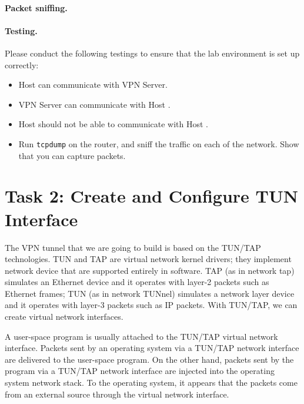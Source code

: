 \paragraph{Packet sniffing.} 




\paragraph{Testing.} Please conduct the following testings to ensure that the 
lab environment is set up correctly:

\begin{itemize}[noitemsep]
\item Host \hostu can communicate with VPN Server.

\item VPN Server can communicate with Host \hostv.

\item Host \hostu should not be able to communicate with Host \hostv. 

\item Run \texttt{tcpdump} on the router, and sniff the traffic on each
of the network. Show that you can capture packets.

\end{itemize}



\section{Task 2: Create and Configure TUN Interface}


The VPN tunnel that we are going to build is based on the TUN/TAP 
technologies. 
TUN and TAP are virtual network kernel drivers; they 
implement network device that are supported entirely in software.
TAP (as in network tap) simulates an Ethernet device and it operates with 
layer-2 packets such as Ethernet frames; TUN (as in network TUNnel) simulates a
network layer device and it operates with layer-3 packets such as IP packets.
With TUN/TAP, we can create virtual network interfaces. 


A user-space program is usually attached to the TUN/TAP virtual network interface.
Packets sent by an operating system via a TUN/TAP network interface 
are delivered to the user-space program. On the other hand,
packets sent by the program
via a TUN/TAP network interface are injected into the operating system
network stack. To the operating system,
it appears that the packets come from an external source
through the virtual network interface.


